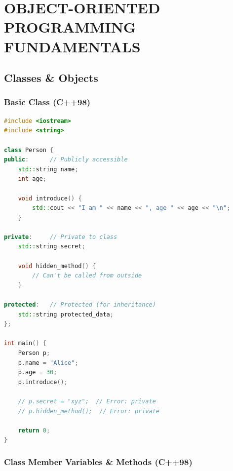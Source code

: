 \hypertarget{object-oriented-programming-fundamentals}{%
\chapter{OBJECT-ORIENTED PROGRAMMING
FUNDAMENTALS}\label{object-oriented-programming-fundamentals}}

\hypertarget{classes-objects}{%
\section{Classes \& Objects}\label{classes-objects}}

\hypertarget{basic-class-c98}{%
\subsection{Basic Class (C++98)}\label{basic-class-c98}}

\begin{lstlisting}[language={C++}]
#include <iostream>
#include <string>

class Person {
public:      // Publicly accessible
    std::string name;
    int age;
    
    void introduce() {
        std::cout << "I am " << name << ", age " << age << "\n";
    }
    
private:     // Private to class
    std::string secret;
    
    void hidden_method() {
        // Can't be called from outside
    }
    
protected:   // Protected (for inheritance)
    std::string protected_data;
};

int main() {
    Person p;
    p.name = "Alice";
    p.age = 30;
    p.introduce();
    
    // p.secret = "xyz";  // Error: private
    // p.hidden_method();  // Error: private
    
    return 0;
}
\end{lstlisting}

\hypertarget{class-member-variables-methods-c98}{%
\subsection{Class Member Variables \& Methods
(C++98)}\label{class-member-variables-methods-c98}}

